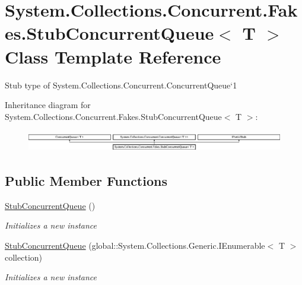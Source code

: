 \hypertarget{class_system_1_1_collections_1_1_concurrent_1_1_fakes_1_1_stub_concurrent_queue_3_01_t_01_4}{\section{System.\-Collections.\-Concurrent.\-Fakes.\-Stub\-Concurrent\-Queue$<$ T $>$ Class Template Reference}
\label{class_system_1_1_collections_1_1_concurrent_1_1_fakes_1_1_stub_concurrent_queue_3_01_t_01_4}
}


Stub type of System.\-Collections.\-Concurrent.\-Concurrent\-Queue`1 


Inheritance diagram for System.\-Collections.\-Concurrent.\-Fakes.\-Stub\-Concurrent\-Queue$<$ T $>$\-:\begin{figure}[H]
\begin{center}
\leavevmode
\includegraphics[height=0.947547cm]{class_system_1_1_collections_1_1_concurrent_1_1_fakes_1_1_stub_concurrent_queue_3_01_t_01_4}
\end{center}
\end{figure}
\subsection*{Public Member Functions}
\begin{DoxyCompactItemize}
\item 
\hyperlink{class_system_1_1_collections_1_1_concurrent_1_1_fakes_1_1_stub_concurrent_queue_3_01_t_01_4_acd002bc2c84431dd104e5083dd6b1687}{Stub\-Concurrent\-Queue} ()
\begin{DoxyCompactList}\small\item\em Initializes a new instance\end{DoxyCompactList}\item 
\hyperlink{class_system_1_1_collections_1_1_concurrent_1_1_fakes_1_1_stub_concurrent_queue_3_01_t_01_4_ab7f5fe9ec2c82d5c224d6bec78270501}{Stub\-Concurrent\-Queue} (global\-::\-System.\-Collections.\-Generic.\-I\-Enumerable$<$ T $>$ collection)
\begin{DoxyCompactList}\small\item\em Initializes a new instance\end{DoxyCompactList}\end{DoxyCompactItemize}
